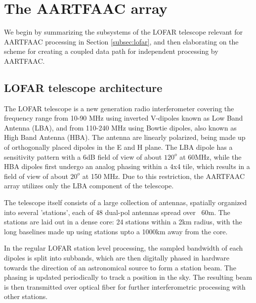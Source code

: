 \documentclass{ws-jai}
\begin{document}
\section {\label{sec:aartfaac_array}The AARTFAAC array}
We  begin by  summarizing the  subsystems of  the LOFAR  telescope relevant  for
AARTFAAC processing in  Section \ref{subsec:lofar}, and then  elaborating on the
scheme for creating a coupled data path for independent processing by AARTFAAC.

\subsection {\label{subsec:lofar} LOFAR telescope architecture}
The  LOFAR  telescope  \citep{van2013lofar}  is a  new  generation  radio
interferometer  covering  the frequency  range  from  10-90 MHz  using  inverted
V-dipoles known  as Low Band  Antenna (LBA), and  from 110-240 MHz  using Bowtie
dipoles,  also known  as  High Band  Antenna (HBA).   The  antenna are  linearly
polarized, being made  up of orthogonally placed  dipoles in the E  and H plane.
The LBA  dipole has  a sensitivity  pattern with a  6dB field  of view  of about
$120^o$ at 60MHz, while the HBA dipoles first undergo an analog phasing within a
4x4 tile, which results  in a field of view of about $20^o$  at 150 MHz.  Due to
this restriction,  the AARTFAAC  array utilizes  only the  LBA component  of the
telescope.

The  telescope itself  consists of  a  large collection  of antennas,  spatially
organized  into several  'stations', each  of 48  dual-pol antennas  spread over
~60m.  The  stations are  laid out  in a dense  core: 24  stations within  a 2km
radius, with the long  baselines made up using stations upto  a 1000km away from
the core. 

In the  regular LOFAR station  level processing,  the sampled bandwidth  of each
dipoles is  split into  subbands, which  are then  digitally phased  in hardware
towards the  direction of  an astronomical  source to form  a station  beam. The
phasing is  updated periodically to track  a position in the  sky. The resulting
beam  is  then  transmitted  over  optical  fiber  for  further  interferometric
processing with other stations.
\end{document}
